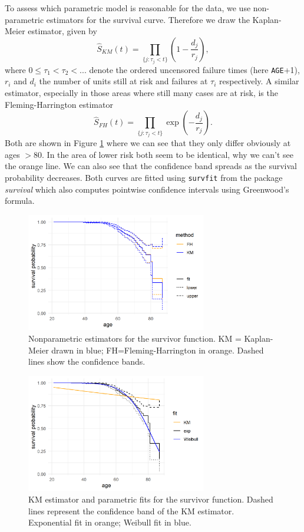 To assess which parametric model is reasonable for the data, we use non-parametric estimators for the survival curve. Therefore we draw the Kaplan-Meier estimator, given by $$\hat{S}_{KM}(t)=\prod_{\{j:\tau_j<t\}}(1-\frac{d_j}{r_j}),$$ where $0\leq \tau_1<\tau_2<...$ denote the ordered uncensored failure times (here \texttt{AGE}+1), $r_i$ and $d_i$ the number of units still at risk and failures at $\tau_i$ respectively. A similar estimator, especially in those areas where still many cases are at risk, is the Fleming-Harrington estimator $$\hat{S}_{FH}(t)=\prod_{\{j:\tau_j<t\}}\exp(-\frac{d_j}{r_j}).$$ Both are shown in Figure \ref{5nonpar} where we can see that they only differ obviously at ages $>80$. In the area of lower risk both seem to be identical, why we can't see the orange line. We can also see that the confidence band spreads as the survival probability decreases. Both curves are fitted using \texttt{survfit} from the package \textit{survival} which also computes pointwise confidence intervals using Greenwood's formula.  
\begin{figure}[!t]
\centering
\includegraphics[width=0.7\textwidth, keepaspectratio]{ex4/survfits.png}
\caption{Nonparametric estimators for the survivor function. KM = Kaplan-Meier drawn in blue; FH=Fleming-Harrington in orange. Dashed lines show the confidence bands.}
\label{5nonpar}
\end{figure}
\begin{figure}[!b]
\centering
\includegraphics[width=0.7\textwidth, keepaspectratio]{ex4/paramsurvfits.png}
\caption{KM estimator and parametric fits for the survivor function. Dashed lines represent the confidence band of the KM estimator. Exponential fit in orange; Weibull fit in blue.}
\label{5parfit}
\end{figure}

